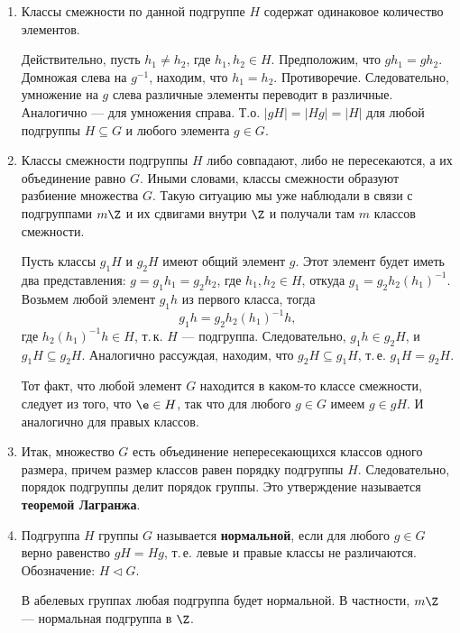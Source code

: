 \begin{enumerate}
\item Классы смежности по данной подгруппе $H$ содержат одинаковое количество элементов.

Действительно, пусть $h_1\ne h_2$, где $h_1,h_2\in H$. Предположим, что $gh_1=gh_2$. Домножая слева на $g^{-1}$, находим, что $h_1=h_2$. Противоречие. Следовательно, умножение на $g$ слева различные элементы переводит в различные. Аналогично --- для умножения справа. Т.о. $|gH|=|Hg|=|H|$ для любой подгруппы $H\subseteq G$ и любого элемента $g\in G$.

\item Классы смежности подгруппы $H$ либо совпадают, либо не пересекаются, а их объединение равно $G$. Иными словами, классы смежности образуют разбиение множества $G$. Такую ситуацию мы уже наблюдали в связи с подгруппами $m\Z$ и их сдвигами внутри $\Z$ и получали там $m$ классов смежности.

Пусть классы $g_1H$ и $g_2H$ имеют общий элемент $g$. Этот элемент будет иметь два представления: $g=g_1h_1=g_2h_2$, где $h_1,h_2\in H$, откуда $g_1=g_2h_2(h_1)^{-1}$. Возьмем любой элемент $g_1h$ из первого класса, тогда
$$
g_1h = g_2h_2(h_1)^{-1}h,
$$
где $h_2(h_1)^{-1}h\in H$, т.\,к. $H$ --- подгруппа. Следовательно, $g_1h\in g_2H$, и $g_1H\subseteq g_2H$. Аналогично рассуждая, находим, что $g_2H\subseteq g_1H$, т.\,е. $g_1H=g_2H$.

Тот факт, что любой элемент $G$ находится в каком-то классе смежности, следует из того, что $\e\in H$, так что для любого $g\in G$ имеем $g\in gH$. И аналогично для правых классов.

\item Итак, множество $G$ есть объединение непересекающихся классов одного размера, причем размер классов равен порядку подгруппы $H$. Следовательно, порядок подгруппы делит порядок группы. Это утверждение называется \textbf{теоремой Лагранжа}.



\item Подгруппа $H$ группы $G$ называется \textbf{нормальной}, если для любого $g\in G$ верно равенство $gH=Hg$, т.\,е. левые и правые классы не различаются. Обозначение: $H\vartriangleleft G$.

В абелевых группах любая подгруппа будет нормальной. В частности, $m\Z$ --- нормальная подгруппа в $\Z$.


\end{enumerate}
